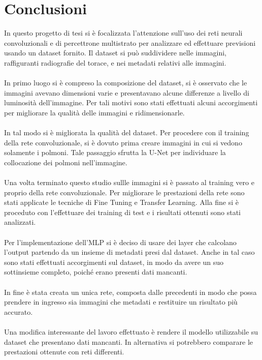 \chapter*{Conclusioni}
In questo progetto di tesi si è focalizzata l'attenzione sull'uso dei reti neurali convoluzionali e di percettrone multistrato per analizzare ed effettuare 
previsioni usando un dataset fornito.
Il dataset si può suddividere nelle immagini, raffiguranti radiografie del torace, e nei metadati relativi alle immagini.
\\\\
In primo luogo si è compreso la composizione del dataset, si è osservato che le immagini avevano dimensioni varie e presentavano alcune differenze a livello 
di luminosità dell'immagine. Per tali motivi sono stati effettuati alcuni accorgimenti per migliorare la qualità delle immagini e ridimensionarle.
\\\\
In tal modo si è migliorata la qualità del dataset. Per procedere con il training della rete convoluzionale, si è dovuto prima creare immagini in cui si vedono solamente i polmoni.
Tale passaggio sfrutta la U-Net per individuare la collocazione dei polmoni nell'immagine.
\\\\
Una volta terminato questo studio sullle immagini si è passato al training vero e proprio della rete convoluzionale.
Per migliorare le prestazioni della rete sono stati applicate le tecniche di Fine Tuning e Transfer Learning.
Alla fine si è proceduto con l'effettuare dei training di test e i risultati ottenuti sono stati analizzati.
\\\\
Per l'implementazione dell'MLP si è deciso di usare dei layer che calcolano l'output partendo da un insieme di metadati presi dal dataset.
Anche in tal caso sono stati effettuati accorgimenti sul dataset, in modo da avere un suo sottinsieme completo, poiché erano presenti dati mancanti.
\\\\
In fine è stata creata un unica rete, composta dalle precedenti in modo che possa prendere in ingresso sia immagini che metadati e restituire un risultato più accurato.
\\\\
Una modifica interessante del lavoro effettuato è rendere il modello utilizzabile su dataset che presentano dati mancanti.
In alternativa si potrebbero comparare le prestazioni ottenute con reti differenti.